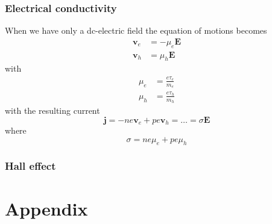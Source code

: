 \documentclass[11pt]{article}
\begin{document}
\subsubsection{Electrical conductivity}
When we have only a dc-electric field the equation of motions becomes
\begin{align}
	\pmb{v}_e &= - \mu_e \pmb{E} \\
	\pmb{v}_h &=  \mu_h \pmb{E} 
\end{align}
with
\begin{align}
	\mu_e &= \frac{e\tau_e}{m_e} \\
	\mu_h &= \frac{e\tau_h}{m_h} 
\end{align}
with the resulting current
\begin{equation}
	\pmb{j} = -ne\pmb{v}_e + pe\pmb{v}_h =\ldots= \sigma \pmb{E}
\end{equation}
where 
\begin{equation}
	\sigma = n e \mu_e + p e \mu_h
\end{equation}

\subsubsection{Hall effect}

\newpage
\clearpage
\appendix
\section{Appendix}
\end{document}
